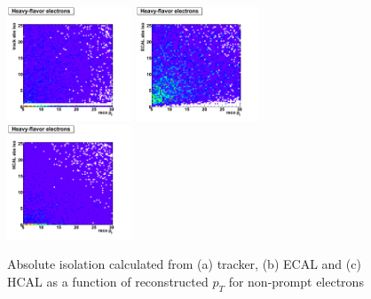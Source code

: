  \begin{figure}[htbp]
    \includegraphics[width = 0.33\textwidth]{pictures/recoPt_absIso/trackIso_elec_nonPrompt.png}
    \includegraphics[width = 0.33\textwidth]{pictures/recoPt_absIso/ecalIso_elec_nonPrompt.png}
    \includegraphics[width = 0.33\textwidth]{pictures/recoPt_absIso/hcalIso_elec_nonPrompt.png}
    \caption{Absolute isolation calculated from (a) tracker, (b) ECAL and (c) HCAL as a function of
       reconstructed $p_{T}$ for non-prompt electrons}
    \label{fig:NonPromptElecRecoPt_AbsIso}
 \end{figure}

